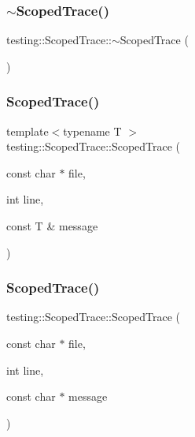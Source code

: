 \subsubsection{\texorpdfstring{$\sim$ScopedTrace()}{~ScopedTrace()}\hspace{0.1cm}{\footnotesize\ttfamily [1/3]}}
{\footnotesize\ttfamily testing\+::\+Scoped\+Trace\+::$\sim$\+Scoped\+Trace (\begin{DoxyParamCaption}{ }\end{DoxyParamCaption})}

\mbox{\label{classtesting_1_1_scoped_trace_a2da90b95d682d518cca472934d53c59c}} 
\subsubsection{\texorpdfstring{ScopedTrace()}{ScopedTrace()}\hspace{0.1cm}{\footnotesize\ttfamily [4/9]}}
{\footnotesize\ttfamily template$<$typename T $>$ \\
testing\+::\+Scoped\+Trace\+::\+Scoped\+Trace (\begin{DoxyParamCaption}\item[{const char $\ast$}]{file,  }\item[{int}]{line,  }\item[{const T \&}]{message }\end{DoxyParamCaption})\hspace{0.3cm}{\ttfamily [inline]}}

\mbox{\label{classtesting_1_1_scoped_trace_accd2a06cc941ffd7d6fe109adfdb4f19}} 
\subsubsection{\texorpdfstring{ScopedTrace()}{ScopedTrace()}\hspace{0.1cm}{\footnotesize\ttfamily [5/9]}}
{\footnotesize\ttfamily testing\+::\+Scoped\+Trace\+::\+Scoped\+Trace (\begin{DoxyParamCaption}\item[{const char $\ast$}]{file,  }\item[{int}]{line,  }\item[{const char $\ast$}]{message }\end{DoxyParamCaption})\hspace{0.3cm}{\ttfamily [inline]}}

